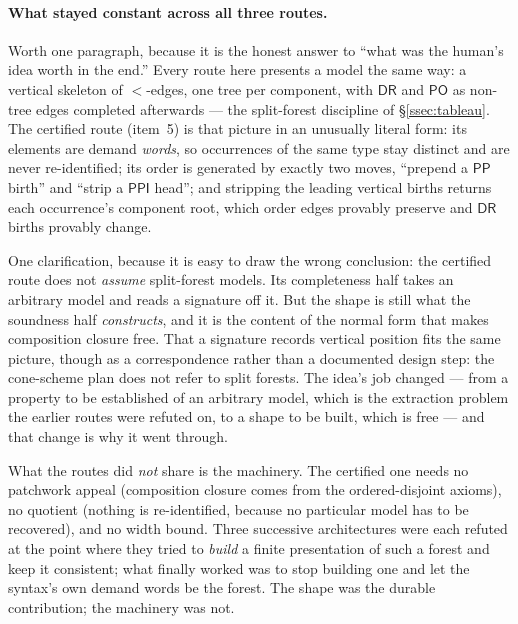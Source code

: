 \documentclass[11pt]{article}
\newcommand{\DR}{\ensuremath{\mathsf{DR}}}
\newcommand{\PO}{\ensuremath{\mathsf{PO}}}
\newcommand{\PP}{\ensuremath{\mathsf{PP}}}
\newcommand{\PPI}{\ensuremath{\mathsf{PPI}}}
\begin{document}
\paragraph{What stayed constant across all three routes.} Worth one
paragraph, because it is the honest answer to ``what was the human's idea worth
in the end.'' Every route here presents a model the same way: a vertical
skeleton of ${<}$-edges, one tree per component, with $\DR$ and $\PO$ as
non-tree edges completed afterwards --- the split-forest discipline of
\S\ref{ssec:tableau}. The certified route (item~5) is that picture in an
unusually literal form: its elements are demand \emph{words}, so occurrences of
the same type stay distinct and are never re-identified; its order is generated
by exactly two moves, ``prepend a $\PP$ birth'' and ``strip a $\PPI$ head''; and
stripping the leading vertical births returns each occurrence's component root,
which order edges provably preserve and $\DR$ births provably change.

One clarification, because it is easy to draw the wrong conclusion: the
certified route does not \emph{assume} split-forest models. Its completeness
half takes an arbitrary model and reads a signature off it. But the shape is
still what the soundness half \emph{constructs}, and it is the content of the
normal form that makes composition closure free. That a signature records
vertical position fits the same picture, though as a correspondence rather than
a documented design step: the cone-scheme plan does not refer to split
forests. The idea's job changed --- from a
property to be established of an arbitrary model, which is the extraction
problem the earlier routes were refuted on, to a shape to be built, which is
free --- and that change is why it went through.

What the routes did \emph{not} share is the machinery. The certified one needs
no patchwork appeal (composition closure comes from the ordered-disjoint
axioms), no quotient (nothing is re-identified, because no particular model has
to be recovered), and no width bound. Three successive architectures were each
refuted at the point where they tried to \emph{build} a finite presentation of
such a forest and keep it consistent; what finally worked was to stop building
one and let the syntax's own demand words be the forest. The shape was the
durable contribution; the machinery was not.
\end{document}
